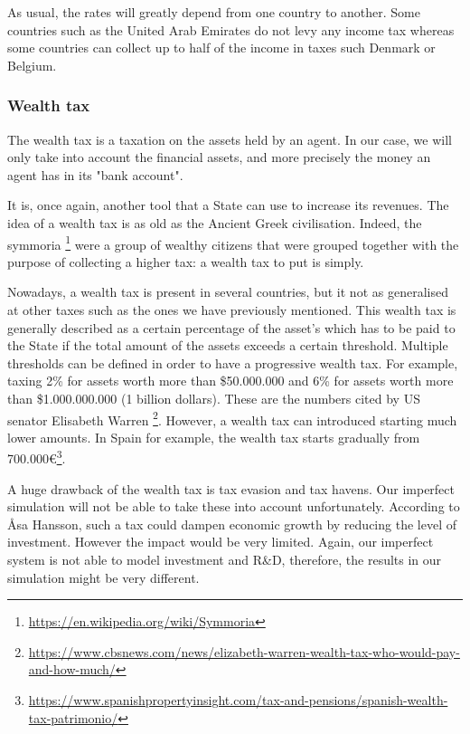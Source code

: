 \documentclass[12pt]{article}
\begin{document}
    As usual, the rates will greatly depend from one country to another. Some countries such as the United Arab Emirates do not levy any income tax whereas some countries can collect up to half of the income in taxes such Denmark or Belgium.
    
    \subsubsection{Wealth tax}\label{section:wealth_tax}
    
    The wealth tax is a taxation on the assets held by an agent. In our case, we will only take into account the financial assets, and more precisely the money an agent has in its "bank account".
    
    It is, once again, another tool that a State can use to increase its revenues. The idea of a wealth tax is as old as the Ancient Greek civilisation. Indeed, the symmoria \footnote{\url{https://en.wikipedia.org/wiki/Symmoria}} were a group of wealthy citizens that were grouped together with the purpose of collecting a higher tax: a wealth tax to put is simply.
    
    Nowadays, a wealth tax is present in several countries, but it not as generalised at other taxes such as the ones we have previously mentioned. This wealth tax is generally described as a certain percentage of the asset's which has to be paid to the State if the total amount of the assets exceeds a certain threshold. Multiple thresholds can be defined in order to have a progressive wealth tax. For example, taxing 2\% for assets worth more than \$50.000.000 and 6\% for assets worth more than \$1.000.000.000 (1 billion dollars). These are the numbers cited by US senator Elisabeth Warren \footnote{\url{https://www.cbsnews.com/news/elizabeth-warren-wealth-tax-who-would-pay-and-how-much/}}. However, a wealth tax can introduced starting much lower amounts. In Spain for example, the wealth tax starts gradually from 700.000\euro \footnote{\url{https://www.spanishpropertyinsight.com/tax-and-pensions/spanish-wealth-tax-patrimonio/}}.
    
    A huge drawback of the wealth tax is tax evasion and tax havens. Our imperfect simulation will not be able to take these into account unfortunately. According to Åsa Hansson, such a tax could dampen economic growth by reducing the level of investment. However the impact would be very limited.\cite{hansson2010wealth} Again, our imperfect system is not able to model investment and R\&D, therefore, the results in our simulation might be very different.
\end{document}

